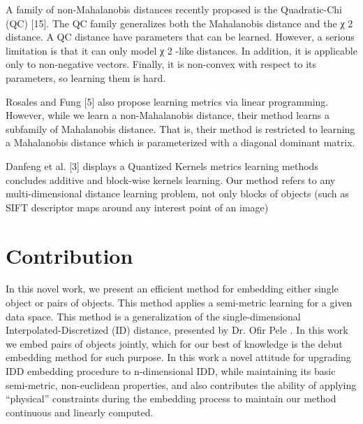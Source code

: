A family of non-Mahalanobis distances recently proposed is the Quadratic-Chi (QC) [15]. The QC family generalizes both the Mahalanobis distance and the χ 2 distance. A QC distance have parameters that can be learned. However, a serious limitation is that it can only model χ 2 -like distances. In addition, it is applicable only to non-negative vectors. Finally, it is non-convex with respect to its parameters, so learning them is hard. 

Rosales and Fung [5] also propose learning metrics via linear programming. However, while we learn a non-Mahalanobis distance, their method learns a subfamily of Mahalanobis distance. That is, their method is restricted to learning a Mahalanobis distance which is parameterized with a diagonal dominant matrix. 

Danfeng et al. [3]  displays a Quantized Kernels metrics learning methods concludes additive and block-wise kernels learning. Our method refers to any multi-dimensional distance learning problem, not only blocks of objects (such as SIFT descriptor maps around any interest point of an image)


\section{Contribution}

In this novel work, we present an efficient method for embedding either single object or pairs of objects.
This method applies a semi-metric learning for a given data space. This method is a generalization of the single-dimensional Interpolated-Discretized (ID) distance, presented by Dr. Ofir Pele \cite{ofirpelethesis}. 
In this work we embed pairs of objects jointly, which for our best of knowledge is the debut embedding method for such purpose.
In this work a novel attitude for upgrading IDD embedding procedure to n-dimensional IDD, while maintaining its basic semi-metric, non-euclidean properties, and also contributes the ability of applying “physical” constraints during the embedding process to maintain our method continuous and linearly computed. 

